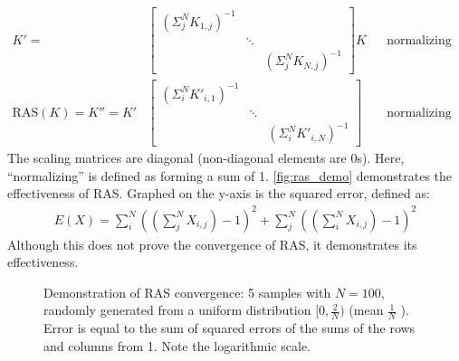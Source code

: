 \begin{align*}
        K'=&\begin{bmatrix}
                (\Sigma_j^N K_{1,j})^{-1}\\
                &\ddots{}\\
                &&(\Sigma_j^N K_{N,j})^{-1}
        \end{bmatrix}K &&\text{normalizing rows}\\
            \text{RAS}(K)=K''=K'&\begin{bmatrix}
                (\Sigma_i^N K'_{i,1})^{-1}\\
                &\ddots{}\\
                &&(\Sigma_i^N K'_{i,N})^{-1}
        \end{bmatrix}&&\text{normalizing columns}
\end{align*}
The scaling matrices are diagonal (non-diagonal elements are $0$s). Here, ``normalizing'' is defined as forming a sum of 1. \autoref{fig:ras_demo} demonstrates the effectiveness of RAS. Graphed on the y-axis is the squared error, defined as:
\begin{align*}
        E(X)=\sum^N_i\left(\left(\sum^N_jX_{i,j}\right)-1\right)^2+\sum^N_j\left(\left(\sum^N_iX_{i,j}\right)-1\right)^2
\end{align*}
Although this does not prove the convergence of RAS, it demonstrates its effectiveness.

\begin{figure}[htpb]
        \centering
        
        \caption{Demonstration of RAS convergence: 5 samples with $N=100$, randomly generated from a uniform distribution $[0,\frac{2}{N})$ (mean $\frac{1}{N}$ ). Error is equal to the sum of squared errors of the sums of the rows and columns from 1. Note the logarithmic scale.}%
        \label{fig:ras_demo}
\end{figure}

